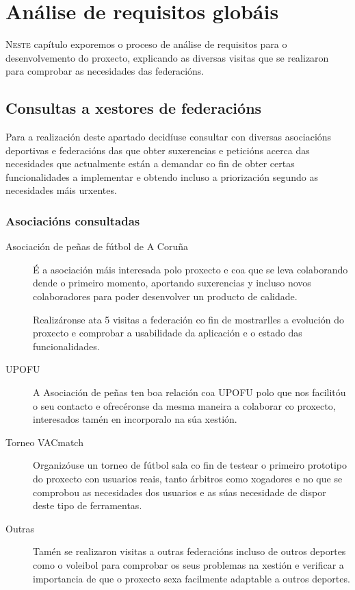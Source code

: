 \chapter{Análise de requisitos globáis}
\minitoc


  \lettrine{N}{este} capítulo exporemos o proceso de análise de requisitos 
para o desenvolvemento do proxecto, explicando as diversas visitas que se 
realizaron para comprobar as necesidades das federacións.

  \section{Consultas a xestores de federacións}
  Para a realización deste apartado decidíuse consultar con diversas asociacións 
deportivas e federacións das que obter suxerencias e peticións acerca das 
necesidades que actualmente están a demandar co fin de obter certas 
funcionalidades a implementar e obtendo incluso a priorización segundo as 
necesidades máis urxentes.

  \subsection{Asociacións consultadas}

  \begin{description}

  \item [Asociación de peñas de fútbol de A Coruña]
  É a asociación máis interesada polo proxecto e coa que se leva colaborando 
dende o primeiro momento, aportando suxerencias y incluso novos colaboradores 
para poder desenvolver un producto de calidade.

  Realizáronse ata 5 visitas a federación co fin de mostrarlles a evolución do 
proxecto e comprobar a usabilidade da aplicación e o estado das funcionalidades.

  \item [UPOFU]
  A Asociación de peñas ten boa relación coa UPOFU polo que nos facilitóu o seu 
contacto e ofrecéronse da mesma maneira a colaborar co proxecto, interesados 
tamén en incorporalo na súa xestión.

  \item [Torneo VACmatch]
  Organizóuse un torneo de fútbol sala co fin de testear o primeiro prototipo 
do proxecto con usuarios reais, tanto árbitros como xogadores e no que se 
comprobou as necesidades dos usuarios e as súas necesidade de dispor deste tipo 
de ferramentas.

  \item [Outras]
  Tamén se realizaron visitas a outras federacións incluso de outros deportes 
como o voleibol para comprobar os seus problemas na xestión e verificar a 
importancia de que o proxecto sexa facilmente adaptable a outros deportes.
  
  \end{description}

